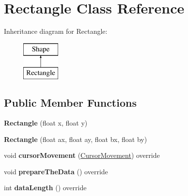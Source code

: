 \hypertarget{classRectangle}{}\section{Rectangle Class Reference}
\label{classRectangle}
Inheritance diagram for Rectangle\+:\begin{figure}[H]
\begin{center}
\leavevmode
\includegraphics[height=2.000000cm]{classRectangle}
\end{center}
\end{figure}
\subsection*{Public Member Functions}
\begin{DoxyCompactItemize}
\item 
{\bfseries Rectangle} (float x, float y)\hypertarget{classRectangle_afcbe2665892e9ed1d32a7400ab1b9160}{}\label{classRectangle_afcbe2665892e9ed1d32a7400ab1b9160}

\item 
{\bfseries Rectangle} (float ax, float ay, float bx, float by)\hypertarget{classRectangle_a16be353bdd049c8f642cd7d3b4156be5}{}\label{classRectangle_a16be353bdd049c8f642cd7d3b4156be5}

\item 
void {\bfseries cursor\+Movement} (\hyperlink{classCursorMovement}{Cursor\+Movement}) override\hypertarget{classRectangle_a45934f6a755e957b821e33bafaff2da8}{}\label{classRectangle_a45934f6a755e957b821e33bafaff2da8}

\item 
void {\bfseries prepare\+The\+Data} () override\hypertarget{classRectangle_a1d1cae3a05652d498f20b3a747082347}{}\label{classRectangle_a1d1cae3a05652d498f20b3a747082347}

\item 
int {\bfseries data\+Length} () override\hypertarget{classRectangle_ac53e8b8a9c1e0df7c36d5d9d83070968}{}\label{classRectangle_ac53e8b8a9c1e0df7c36d5d9d83070968}

\end{DoxyCompactItemize}
